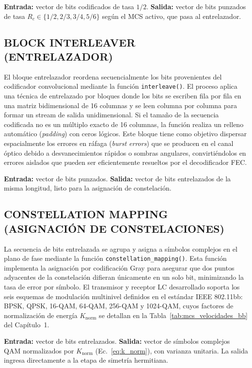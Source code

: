\textbf{Entrada:} vector de bits codificados de tasa $1/2$. \textbf{Salida:} vector de bits punzados de tasa $R_c \in \{1/2, 2/3, 3/4, 5/6\}$ según el MCS activo, que pasa al entrelazador.

\subsection{BLOCK INTERLEAVER (ENTRELAZADOR)}
El bloque entrelazador reordena secuencialmente los bits provenientes del codificador convolucional mediante la función \texttt{interleave()}. El proceso aplica una técnica de entrelazado por bloques donde los bits se escriben fila por fila en una matriz bidimensional de 16 columnas y se leen columna por columna para formar un stream de salida unidimensional. Si el tamaño de la secuencia codificada no es un múltiplo exacto de 16 columnas, la función realiza un relleno automático (\textit{padding}) con ceros lógicos. Este bloque tiene como objetivo dispersar espacialmente los errores en ráfaga (\textit{burst errors}) que se producen en el canal óptico debido a desvanecimientos rápidos o sombras angulares, convirtiéndolos en errores aislados que pueden ser eficientemente resueltos por el decodificador FEC.

\textbf{Entrada:} vector de bits punzados. \textbf{Salida:} vector de bits entrelazados de la misma longitud, listo para la asignación de constelación.

\subsection{CONSTELLATION MAPPING (ASIGNACIÓN DE CONSTELACIONES)}
La secuencia de bits entrelazada se agrupa y asigna a símbolos complejos en el plano de fase mediante la función \texttt{constellation\_mapping()}. Esta función implementa la asignación por codificación Gray para asegurar que dos puntos adyacentes de la constelación difieran únicamente en un solo bit, minimizando la tasa de error por símbolo. El transmisor y receptor LC desarrollado soporta los seis esquemas de modulación multinivel definidos en el estándar IEEE 802.11bb: BPSK, QPSK, 16-QAM, 64-QAM, 256-QAM y 1024-QAM, cuyos factores de normalización de energía $K_{\text{norm}}$ se detallan en la Tabla~\ref{tab:mcs_velocidades_bb} del Capítulo~1.

\textbf{Entrada:} vector de bits entrelazados. \textbf{Salida:} vector de símbolos complejos QAM normalizados por $K_{\text{norm}}$ (Ec.~\ref{eq:k_norm}), con varianza unitaria. La salida ingresa directamente a la etapa de simetría hermitiana.

